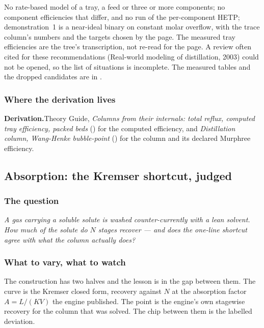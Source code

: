 \documentclass[11pt,a4paper]{article}
\newcommand{\derivation}[1]{%
  \smallskip\noindent\textbf{\sffamily\small Derivation.}\quad #1\par\smallskip}
\begin{document}
No rate-based model of a tray, a feed or three or more components; no
component efficiencies that differ, and no run of the per-component HETP; demonstration~1
is a near-ideal binary on constant molar overflow, with the trace column's
numbers and the targets chosen by the page.  The measured tray efficiencies are
the tree's transcription, not re-read for the page.  A review often cited for
these recommendations (Real-world modeling of distillation, 2003) could not be
opened, so the list of situations is incomplete.  The measured tables and the
dropped candidates are in .

\subsubsection*{Where the derivation lives}

\derivation{Theory Guide, \emph{Columns from their internals: total reflux,
computed tray efficiency, packed beds} (\theorydest{ch:ratebased}) for the
computed efficiency, and \emph{Distillation column, Wang-Henke bubble-point}
(\theorydest{ch:distillation}) for the column and its declared Murphree
efficiency.}

\subsection{Absorption: the Kremser shortcut, judged}\label{sec:edu-kremser}


\subsubsection*{The question}

\emph{A gas carrying a soluble solute is washed counter-currently with a
lean solvent.  How much of the solute do $N$ stages recover --- and does
the one-line shortcut agree with what the column actually does?}

\subsubsection*{What to vary, what to watch}

The construction has two halves and the lesson is in the gap between them.
The curve is the Kremser closed form, recovery against $N$ at the
absorption factor $A = L/(KV)$ the engine published.  The point is the
engine's own stagewise recovery for the column that was solved.  The chip
between them is the labelled deviation.
\end{document}
